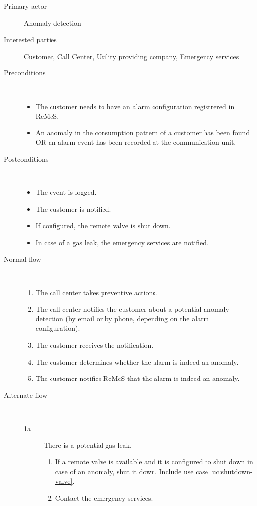 \begin{description}
	\item[Primary actor] Anomaly detection
	\item[Interested parties] Customer, Call Center, Utility providing company,
	Emergency services
	\item[Preconditions] \ 
	\begin{itemize}
		\item The customer needs to have an alarm configuration registrered in ReMeS.
		\item An anomaly in the consumption pattern of a customer has been found OR an
		alarm event has been recorded at the communication unit.
	\end{itemize}
	\item[Postconditions] \ 
	\begin{itemize}
		\item The event is logged.
		\item The customer is notified.
		\item If configured, the remote valve is shut down.
		\item In case of a gas leak, the emergency services are notified. 
	\end{itemize}
	\item[Normal flow] \ 
	\begin{enumerate}
	  	\item The call center takes preventive actions.
	  	\item The call center notifies the customer about a potential anomaly
	  	detection (by email or by phone, depending on the alarm configuration).
	  	\item The customer receives the notification.
	  	\item The customer determines whether the alarm is indeed an anomaly.
	  	\item The customer notifies ReMeS that the alarm is indeed an anomaly.
	\end{enumerate}
	\item[Alternate flow] \ 
	\begin{description}
		\item[1a] There is a potential gas leak.
		\begin{enumerate}
			\item If a remote valve is available and it is configured to shut down in
			case of an anomaly, shut it down. Include use case \ref{uc:shutdown-valve}.
			\item Contact the emergency services.

\end{enumerate}
\end{description}
\end{description}
